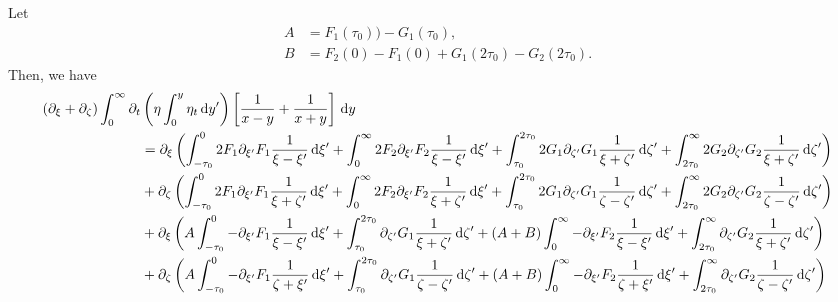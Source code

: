 \documentclass[10pt,reqno,oneside,a4paper, landscape]{article}
\begin{document}
\begin{prop}\label{HTtransformed2}
Let 
\begin{align*}
A &= F_1(\tau_0) ) - G_1(\tau_0), \\
B &= F_2(0) - F_1(0)  +  G_1(2\tau_0) - G_2(2\tau_0). 
\end{align*}
Then, we have 
\begin{align*}
(\partial_\xi + \partial_\zeta)\int_0^\infty \partial_t &\left( \eta \int^{y}_0\eta_{t} \,\mathrm{d} y' \right) \left[ \frac{1}{x-y} + \frac{1}{x+y} \right] \,\mathrm{d} y \\
&= \partial_\xi
\left( 
\int^0_{-\tau_0} 2 F_1 \partial_{\xi'} F_1 \frac{1}{\xi -\xi'} \,\mathrm{d} \xi' + \int^{\infty}_{0} 2 F_2 \partial_{\xi'} F_2 \frac{1}{\xi -\xi'} \,\mathrm{d} \xi' + \int^{2\tau_0}_{\tau_0} 2 G_1 \partial_{\zeta'} G_1 \frac{1}{\xi + \zeta'} \,\mathrm{d} \zeta' + \int^{\infty}_{2\tau_0} 2 G_2 \partial_{\zeta'} G_2 \frac{1}{\xi + \zeta'} \,\mathrm{d} \zeta'
\right) \\
&+ \partial_\zeta \left( 
\int^0_{-\tau_0} 2 F_1 \partial_{\xi'} F_1 \frac{1}{\xi + \zeta'} \,\mathrm{d} \xi' + \int^{\infty}_{0} 2 F_2 \partial_{\xi'} F_2 \frac{1}{\xi + \zeta'} \,\mathrm{d} \xi' + \int^{2\tau_0}_{\tau_0} 2 G_1 \partial_{\zeta'} G_1 \frac{1}{\zeta -\zeta'} \,\mathrm{d} \zeta' + \int^{\infty}_{2\tau_0} 2 G_2 \partial_{\zeta'} G_2 \frac{1}{\zeta -\zeta'} \,\mathrm{d} \zeta'
\right) \\
&+ \partial_\xi \left( A \int^0_{-\tau_0} -\partial_{\xi'}F_1 \frac{1}{\xi - \xi'} \,\mathrm{d} \xi' + \int^{2\tau_0}_{\tau_0} \partial_{\zeta'} G_1 \frac{1}{\xi + \zeta'} \,\mathrm{d} \zeta' + (A+B)\int_0^{\infty} -\partial_{\xi'} F_2 \frac{1}{\xi - \xi'} \,\mathrm{d} \xi' + \int_{2\tau_0}^{\infty} \partial_{\zeta'} G_2 \frac{1}{\xi + \zeta'} \,\mathrm{d} \zeta' \right) \\
&+ \partial_\zeta \left( A \int^0_{-\tau_0} -\partial_{\xi'} F_1  \frac{1}{\zeta + \xi'}  \,\mathrm{d} \xi' + \int^{2\tau_0}_{\tau_0} \partial_{\zeta'} G_1 \frac{1}{\zeta - \zeta'} \,\mathrm{d} \zeta' + (A+B) \int_0^{\infty} -\partial_{\xi'} F_2  \frac{1}{\zeta + \xi'} \,\mathrm{d} \xi'  + \int_{2\tau_0}^{\infty} \partial_{\zeta'} G_2 \frac{1}{\zeta - \zeta'}\,\mathrm{d} \zeta'  \right)
\end{align*}
\end{prop}
\end{document}
